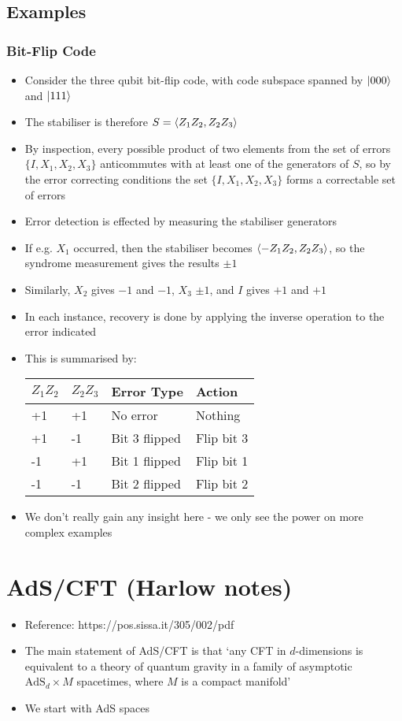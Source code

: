 \documentclass[12pt,a4paper]{article}
\numberwithin{equation}{section}
\begin{document}
	\subsection{Examples}
	\subsubsection{Bit-Flip Code}
	\begin{itemize}
		\item Consider the three qubit bit-flip code, with code subspace spanned by $\ket{000}$ and $\ket{111}$
		\item The stabiliser is therefore $S=\braket{Z_{1}Z_{2},Z_{2}Z_{3}}$
		\item By inspection, every possible product of two elements from the set of errors $\{I,X_{1},X_{2},X_{3}\}$ anticommutes with at least one of the generators of $S$, so by the error correcting conditions the set $\{I,X_{1},X_{2},X_{3}\}$ forms a correctable set of errors
		\item Error detection is effected by measuring the stabiliser generators
		\item If e.g. $X_{1}$ occurred, then the stabiliser becomes $\braket{-Z_{1}Z_{2},Z_{2}Z_{3}}$, so the syndrome measurement gives the results $\pm 1$
		\item Similarly, $X_{2}$ gives $-1$ and $-1$, $X_{3}$ $\pm1$, and $I$ gives $+1$ and $+1$
		\item In each instance, recovery is done by applying the inverse operation to the error indicated
		\item This is summarised by:
		\begin{table}[h]
			\centering
			\begin{tabular}{l|l|l|l}
				$Z_{1}Z_{2}$ & $Z_{2}Z_{3}$ & Error Type & Action \\ \hline
				+1&       +1&   No error  & Nothing \\
				+1&       -1&   Bit 3 flipped  & Flip bit 3 \\
				-1&       +1&   Bit 1 flipped  &  Flip bit 1\\
				-1&       -1&   Bit 2 flipped  & Flip bit 2
			\end{tabular}
		\end{table}
		\item We don't really gain any insight here - we only see the power on more complex examples
	\end{itemize}
	\section{AdS/CFT (Harlow notes)}
	\begin{itemize}
		\item Reference: https://pos.sissa.it/305/002/pdf
		\item The main statement of AdS/CFT is that `any CFT in $d$-dimensions is equivalent to a theory of quantum gravity in a family of asymptotic $\text{AdS}_{d}\times M$ spacetimes, where $M$ is a compact manifold'
		\item We start with AdS spaces
	\end{itemize}
\end{document}
